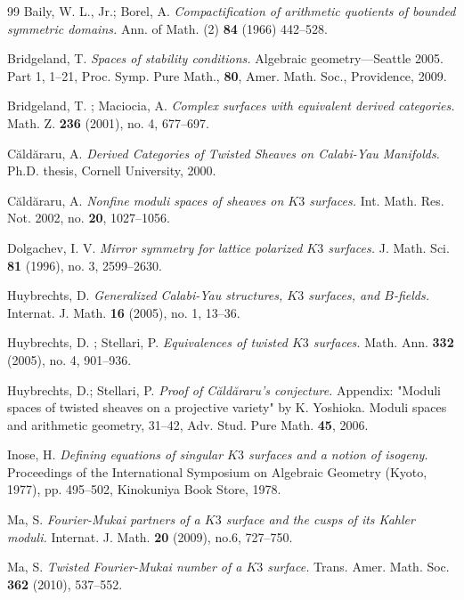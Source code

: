 \documentclass{article}
\theoremstyle{plain}
\theoremstyle{definition}
\theoremstyle{remark}
\begin{document}
\begin{thebibliography}{99}
 Baily, W. L., Jr.; Borel, A. {\it Compactification of arithmetic quotients of bounded symmetric domains.\/} Ann. of Math. (2) \textbf{84} (1966) 442--528.

 Bridgeland, T. {\it Spaces of stability conditions.\/} Algebraic geometry---Seattle 2005. Part 1, 1--21, 
Proc. Symp. Pure Math., \textbf{80}, Amer. Math. Soc., Providence,  2009.  

 Bridgeland, T. ; Maciocia, A.  {\it Complex surfaces with equivalent derived categories.\/}  Math. Z. \textbf{236} (2001), no. 4, 677--697. 

  C\u ald\u araru, A. {\it Derived Categories of Twisted Sheaves on Calabi-Yau Manifolds.\/} Ph.D. thesis, Cornell University, 2000. 

 C\u ald\u araru, A. {\it Nonfine moduli spaces of sheaves on $K3$ surfaces.\/} Int. Math. Res. Not. 2002, no. \textbf{20}, 1027--1056.

 Dolgachev, I. V. {\it Mirror symmetry for lattice polarized $K3$ surfaces.\/} J. Math. Sci.     \textbf{81} (1996), no. 3, 2599--2630. 

 Huybrechts, D. {\it Generalized Calabi-Yau structures, $K3$ surfaces, and $B$-fields.\/} Internat. J. Math. \textbf{16} (2005), no. 1, 13--36. 

 Huybrechts, D. ; Stellari, P. {\it Equivalences of twisted $K3$ surfaces.\/}  Math. Ann. \textbf{332} (2005), no. 4, 901--936.

 Huybrechts, D.; Stellari, P. {\it Proof of C\u ald\u araru's conjecture.\/}  
Appendix: "Moduli spaces of twisted sheaves on a projective variety"  by K. Yoshioka. Moduli spaces and arithmetic geometry, 31--42, 
Adv. Stud. Pure Math. \textbf{45}, 2006.

 Inose, H.  {\it Defining equations of singular $K3$ surfaces and a notion of isogeny.\/} 
Proceedings of the International Symposium on Algebraic Geometry (Kyoto, 1977), pp. 495--502, Kinokuniya Book Store, 1978.

 Ma, S. {\it Fourier-Mukai partners of a $K3$ surface and the cusps of its Kahler moduli.\/} 
Internat. J. Math. \textbf{20} (2009), no.6, 727--750.  

 Ma, S. {\it Twisted Fourier-Mukai number of a $K3$ surface.\/} 
Trans. Amer. Math. Soc. \textbf{362} (2010), 537--552.


\end{thebibliography}
\end{document}
